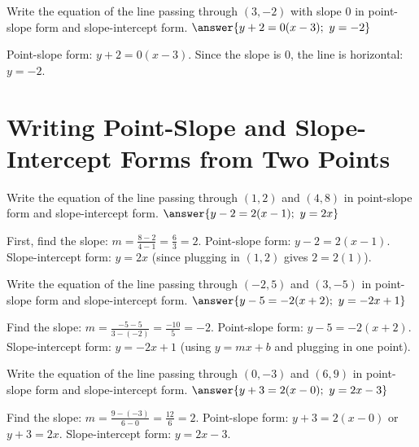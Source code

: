 \documentclass{ximera}
\begin{document}
\begin{problem}
Write the equation of the line passing through $(3, -2)$ with slope $0$ in point-slope form and slope-intercept form. $\answer{y + 2 = 0(x - 3);\ y = -2}$
\begin{feedback}
Point-slope form: $y + 2 = 0(x - 3)$. Since the slope is $0$, the line is horizontal: $y = -2$.
\end{feedback}
\end{problem}


\section*{Writing Point-Slope and Slope-Intercept Forms from Two Points}

\begin{problem}
Write the equation of the line passing through $(1, 2)$ and $(4, 8)$ in point-slope form and slope-intercept form. $\answer{y - 2 = 2(x - 1);\ y = 2x}$ 
\begin{feedback}
First, find the slope: $m = \frac{8 - 2}{4 - 1} = \frac{6}{3} = 2$.  
Point-slope form: $y - 2 = 2(x - 1)$.  
Slope-intercept form: $y = 2x$ (since plugging in $(1, 2)$ gives $2 = 2(1)$).
\end{feedback}
\end{problem}

\begin{problem}
Write the equation of the line passing through $(-2, 5)$ and $(3, -5)$ in point-slope form and slope-intercept form. $\answer{y - 5 = -2(x + 2);\ y = -2x + 1}$
\begin{feedback}
Find the slope: $m = \frac{-5 - 5}{3 - (-2)} = \frac{-10}{5} = -2$.  
Point-slope form: $y - 5 = -2(x + 2)$.  
Slope-intercept form: $y = -2x + 1$ (using $y = mx + b$ and plugging in one point).
\end{feedback}
\end{problem}

\begin{problem}
Write the equation of the line passing through $(0, -3)$ and $(6, 9)$ in point-slope form and slope-intercept form. $\answer{y + 3 = 2(x - 0);\ y = 2x - 3}$
\begin{feedback}
Find the slope: $m = \frac{9 - (-3)}{6 - 0} = \frac{12}{6} = 2$.  
Point-slope form: $y + 3 = 2(x - 0)$ or $y + 3 = 2x$.  
Slope-intercept form: $y = 2x - 3$.
\end{feedback}
\end{problem}
\end{document}
